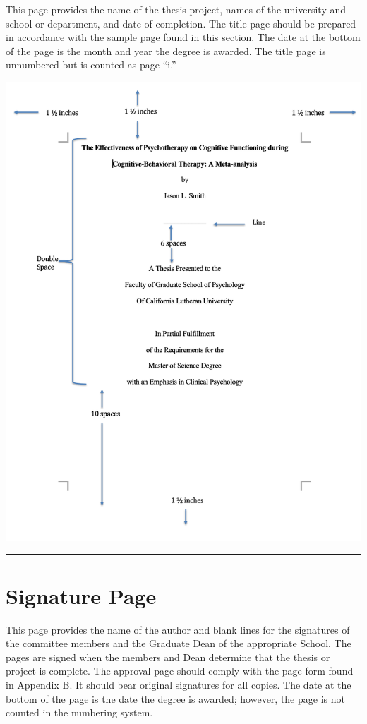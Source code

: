 \documentclass[openany]{book}
\begin{document}
This page provides the name of the thesis project, names of the university and school or department, and date of completion. The title page should be prepared in accordance with the sample page found in this section. The date at the bottom of the page is the month and year the degree is awarded. The title page is unnumbered but is counted as page ``i.''

\includegraphics{images/titlepage.png}

\begin{center}\rule{0.5\linewidth}{0.5pt}\end{center}

\hypertarget{signature-page}{%
\section{Signature Page}\label{signature-page}}

This page provides the name of the author and blank lines for the signatures of the committee members and the Graduate Dean of the appropriate School. The pages are signed when the members and Dean determine that the thesis or project is complete. The approval page should comply with the page form found in Appendix B. It should bear original signatures for all copies. The date at the bottom of the page is the date the degree is awarded; however, the page is not counted in the numbering system.
\end{document}

